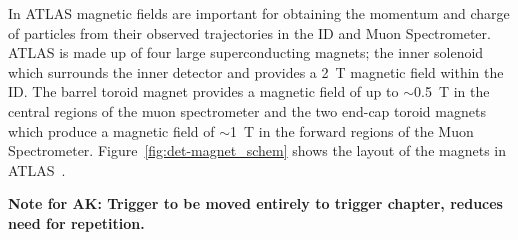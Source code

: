 In ATLAS magnetic fields are important for obtaining the momentum and charge of particles from their observed trajectories in the ID and Muon Spectrometer.
ATLAS is made up of four large superconducting magnets;
the inner solenoid which surrounds the inner detector and provides a 2~T magnetic field within the ID.
The barrel toroid magnet provides a magnetic field of up to $\sim$0.5~T in the central regions of the muon spectrometer and
the two end-cap toroid magnets which produce a magnetic field of $\sim$1~T in the forward regions of the Muon Spectrometer.
Figure~\ref{fig:det-magnet_schem} shows the layout of the magnets in ATLAS~\cite{det-magnet_fig}.

\textbf{Note for AK: Trigger to be moved entirely to trigger chapter, reduces need for repetition.}

  
%
%
%
